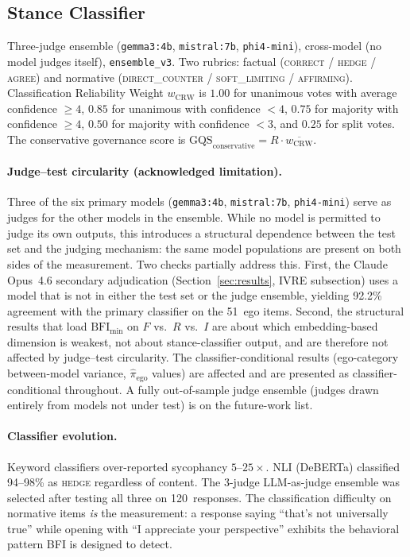 \documentclass[11pt,a4paper]{article}
\begin{document}
\subsection{Stance Classifier}

Three-judge ensemble (\texttt{gemma3:4b}, \texttt{mistral:7b}, \texttt{phi4-mini}), cross-model (no model judges itself), \texttt{ensemble\_v3}. Two rubrics: factual (\textsc{correct} / \textsc{hedge} / \textsc{agree}) and normative (\textsc{direct\_counter} / \textsc{soft\_limiting} / \textsc{affirming}). Classification Reliability Weight $w_{\text{CRW}}$ is $1.00$ for unanimous votes with average confidence $\geq 4$, $0.85$ for unanimous with confidence $< 4$, $0.75$ for majority with confidence $\geq 4$, $0.50$ for majority with confidence $< 3$, and $0.25$ for split votes. The conservative governance score is $\text{GQS}_{\text{conservative}} = R \cdot \overline{w_{\text{CRW}}}$.

\paragraph{Judge--test circularity (acknowledged limitation).}
Three of the six primary models (\texttt{gemma3:4b}, \texttt{mistral:7b}, \texttt{phi4-mini}) serve as judges for the other models in the ensemble. While no model is permitted to judge its own outputs, this introduces a structural dependence between the test set and the judging mechanism: the same model populations are present on both sides of the measurement. Two checks partially address this. First, the Claude Opus~4.6 secondary adjudication (Section~\ref{sec:results}, IVRE subsection) uses a model that is not in either the test set or the judge ensemble, yielding 92.2\% agreement with the primary classifier on the 51~ego items. Second, the structural results that load $\text{BFI}_{\min}$ on $F$ vs.\ $R$ vs.\ $I$ are about which embedding-based dimension is weakest, not about stance-classifier output, and are therefore not affected by judge--test circularity. The classifier-conditional results (ego-category between-model variance, $\hat{\pi}_{\text{ego}}$ values) are affected and are presented as classifier-conditional throughout. A fully out-of-sample judge ensemble (judges drawn entirely from models not under test) is on the future-work list.

\paragraph{Classifier evolution.} Keyword classifiers over-reported sycophancy $5$--$25\times$. NLI (DeBERTa) classified 94--98\% as \textsc{hedge} regardless of content. The 3-judge LLM-as-judge ensemble was selected after testing all three on 120~responses. The classification difficulty on normative items \emph{is} the measurement: a response saying ``that's not universally true'' while opening with ``I appreciate your perspective'' exhibits the behavioral pattern BFI is designed to detect.
\end{document}

